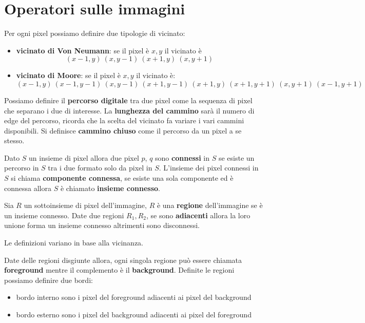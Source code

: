 \chapter{Operatori sulle immagini}
Per ogni pixel possiamo definire due tipologie di vicinato:
\begin{itemize}
    \item \textbf{vicinato di Von Neumann}: se il pixel è $x,y$ il vicinato è
          \begin{equation*}
              (x-1, y) \ (x, y-1) \ (x+1, y) \ (x, y+1)
          \end{equation*}
    \item \textbf{vicinato di Moore}: se il pixel è $x,y$ il vicinato è:
          \begin{equation*}
              (x-1, y) \ (x-1, y-1) \ (x, y-1) \ (x+1, y-1) \ (x+1, y) \ (x+1, y+1)
              \ (x, y+1) \ (x-1, y+1)
          \end{equation*}
\end{itemize}
Possiamo definire il \textbf{percorso digitale} tra due pixel come la sequenza di
pixel che separano i due di interesse. La \textbf{lunghezza del cammino} sarà il
numero di edge del percorso, ricorda che la scelta del vicinato fa variare i vari
cammini disponibili. Si definisce \textbf{cammino chiuso} come il percorso da un
pixel a se stesso.

Dato $S$ un insieme di pixel allora due pixel $p$, $q$ sono \textbf{connessi} in
$S$ se esiste un percorso in $S$ tra i due formato solo da pixel in $S$. L'insieme
dei pixel connessi in $S$ si chiama \textbf{componente connessa}, se esiste una
sola componente ed è connessa allora $S$ è chiamato \textbf{insieme connesso}.

Sia $R$ un sottoinsieme di pixel dell'immagine, $R$ è una \textbf{regione} dell'immagine
se è un insieme connesso. Date due regioni $R_1,R_2$, se sono \textbf{adiacenti}
allora la loro unione forma un insieme connesso altrimenti sono disconnessi.

\begin{nota}
    Le definizioni variano in base alla vicinanza.
\end{nota}

Date delle regioni disgiunte allora, ogni singola regione può essere chiamata
\textbf{foreground} mentre il complemento è il \textbf{background}. Definite le
regioni possiamo definire due bordi:
\begin{itemize}
    \item bordo interno sono i pixel del foreground adiacenti ai pixel del background
    \item bordo esterno sono i pixel del background adiacenti ai pixel del foreground
\end{itemize}

